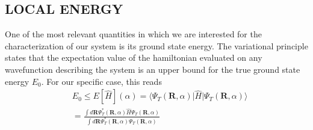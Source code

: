 \subsection{LOCAL ENERGY}
One of the most relevant quantities in which we are interested for the characterization of our system is its ground state energy. The variational principle states that the expectation value of the hamiltonian evaluated on any wavefunction describing the system is an upper bound for the true ground state energy $E_0$. For our specific case, this reads 
\begin{align*}
    &E_0 \leq E [ \hat{H} ](\alpha) = \langle \Psi_T(\bm{R}, \alpha) \vert \hat{H} \vert \Psi_T(\bm{R}, \alpha) \rangle \\
    &= \frac{\int d\bm{R} \Psi_T^*(\bm{R}, \alpha) \hat{H} \Psi_T(\bm{R}, \alpha) }{\int d\bm{R} \Psi_T^*(\bm{R}, \alpha) \Psi_T(\bm{R}, \alpha)}
\end{align*}

